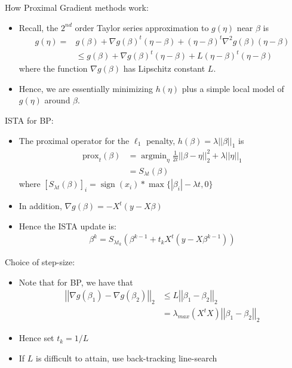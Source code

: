 \documentclass[xcolor=dvipsnames,aspectratio=1610]{beamer}
\newcommand{\norm}[1]{\left|\left|#1\right|\right|}
\newcommand{\abs}[1]{\left|#1\right|}
\DeclareMathOperator*{\sign}{sign}
\DeclareMathOperator*{\argmin}{argmin}
\theoremstyle{remark}
\begin{document}
\begin{frame}{How Proximal Gradient methods work:}
  \begin{itemize}
    \setlength{\itemsep}{10pt}
\item Recall, the $2^{nd}$ order Taylor series approximation to $g(\eta)$ near $\beta$ is 
\begin{align*}
g(\eta) =& g(\beta) + \nabla g(\beta)^t (\eta - \beta) + (\eta-\beta)^t \nabla^2 g(\beta) (\eta -\beta) \\
&\leq  g(\beta) + \nabla g(\beta)^t (\eta - \beta) + L (\eta-\beta)^t (\eta -\beta)
\end{align*}
where the function $\nabla g(\beta)$ has Lipschitz constant $L$.
\item Hence, we are essentially minimizing $h(\eta)$ plus a simple local model of $g(\eta)$ around $\beta$.
  \end{itemize}
\end{frame}

\begin{frame}{ISTA for BP:}
  \begin{itemize}
    \setlength{\itemsep}{10pt}
\item The proximal operator for the $\ell_1$
penalty, $h(\beta) = \lambda \norm{\beta}_1$ is 
\begin{align*}
\text{prox}_t(\beta) 
&= \argmin_{\eta} \frac{1}{2t} \norm{\beta-\eta}_2^2 +
  \lambda \norm{\eta}_1 \\
 &= S_{\lambda t} (\beta)
\end{align*}
where $[S_{\lambda t} (\beta)]_i = \sign (x_i)* \max\{ \abs{\beta_i} - \lambda
t, 0 \}$
\item In addition, $\nabla g(\beta) = -X^t (y -
X \beta)$
\item Hence the ISTA update is:
\begin{align*}
\beta^{k} = S_{\lambda t_k} (\beta^{k-1} + t_k X^t (y -
X \beta^{k-1})) 
\end{align*}
  \end{itemize}
\end{frame}

\begin{frame}{Choice of step-size:}
  \begin{itemize}
    \setlength{\itemsep}{10pt}
\item Note that for BP, we have that 
\begin{align*}
\norm{\nabla g(\beta_1) - \nabla g(\beta_2)}_2 & \leq L \norm{\beta_1 - \beta_2}_2 \\
&= \lambda_{max}(X^t X) \norm{\beta_1 - \beta_2}_2
\end{align*}
\item Hence set $t_k = 1/L$
\item If $L$ is difficult to attain, use back-tracking line-search
  \end{itemize}
\end{frame}
\end{document}
